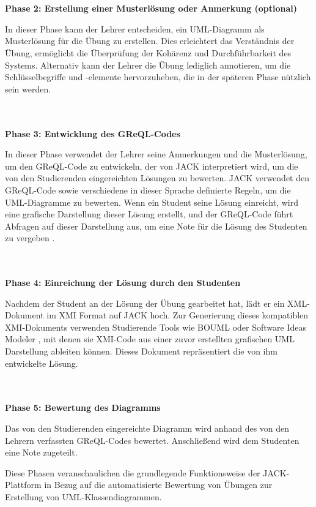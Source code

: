 \\~\\
\textbf{Phase 2: Erstellung einer Musterlösung oder Anmerkung (optional)}

In dieser Phase kann der Lehrer entscheiden, ein UML-Diagramm als Musterlösung für die Übung zu erstellen. Dies erleichtert das Verständnis der Übung, ermöglicht die Überprüfung der Kohärenz und Durchführbarkeit des Systems. Alternativ kann der Lehrer die Übung lediglich annotieren, um die Schlüsselbegriffe und -elemente hervorzuheben, die in der späteren Phase nützlich sein werden.

\\~\\
\textbf{Phase 3: Entwicklung des GReQL-Codes}

In dieser Phase verwendet der Lehrer seine Anmerkungen und die Musterlösung, um den GReQL-Code zu entwickeln, der von JACK interpretiert wird, um die von den Studierenden eingereichten Lösungen zu bewerten. JACK verwendet den GReQL-Code sowie verschiedene in dieser Sprache definierte Regeln, um die UML-Diagramme zu bewerten. Wenn ein Student seine Lösung einreicht, wird eine grafische Darstellung dieser Lösung erstellt, und der GReQL-Code führt Abfragen auf dieser Darstellung aus, um eine Note für die Lösung des Studenten zu vergeben \cite{striewe2011automated}.

\\~\\
\textbf{Phase 4: Einreichung der Lösung durch den Studenten}

Nachdem der Student an der Lösung der Übung gearbeitet hat, lädt er ein XML-Dokument im XMI Format auf JACK hoch. Zur Generierung dieses kompatiblen XMI-Dokuments verwenden Studierende Tools wie BOUML \cite{bouml} oder Software Ideas Modeler \cite{sim}, mit denen sie XMI-Code aus einer zuvor erstellten grafischen UML Darstellung ableiten können. Dieses Dokument repräsentiert die von ihm entwickelte Lösung.

\\~\\
\textbf{Phase 5: Bewertung des Diagramms}

Das von den Studierenden eingereichte Diagramm wird anhand des von den Lehrern verfassten GReQL-Codes bewertet. Anschließend wird dem Studenten eine Note zugeteilt.


Diese Phasen veranschaulichen die grundlegende Funktionsweise der JACK-Plattform in Bezug auf die automatisierte Bewertung von Übungen zur Erstellung von UML-Klassendiagrammen.


